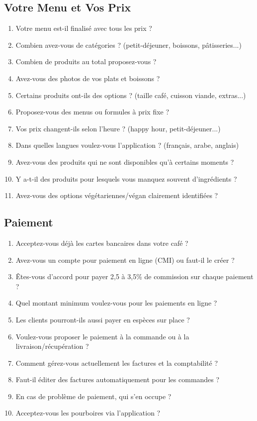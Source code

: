 \documentclass[11pt,a4paper]{article}
\begin{document}
\subsection{Votre Menu et Vos Prix}

\begin{enumerate}[resume]
    \item Votre menu est-il finalisé avec tous les prix ?
    \item Combien avez-vous de catégories ? (petit-déjeuner, boissons, pâtisseries...)
    \item Combien de produits au total proposez-vous ?
    \item Avez-vous des photos de vos plats et boissons ?
    \item Certains produits ont-ils des options ? (taille café, cuisson viande, extras...)
    \item Proposez-vous des menus ou formules à prix fixe ?
    \item Vos prix changent-ils selon l'heure ? (happy hour, petit-déjeuner...)
    \item Dans quelles langues voulez-vous l'application ? (français, arabe, anglais)
    \item Avez-vous des produits qui ne sont disponibles qu'à certains moments ?
    \item Y a-t-il des produits pour lesquels vous manquez souvent d'ingrédients ?
    \item Avez-vous des options végétariennes/végan clairement identifiées ?
\end{enumerate}

\subsection{Paiement}

\begin{enumerate}[resume]
    \item Acceptez-vous déjà les cartes bancaires dans votre café ?
    \item Avez-vous un compte pour paiement en ligne (CMI) ou faut-il le créer ?
    \item Êtes-vous d'accord pour payer 2,5 à 3,5\% de commission sur chaque paiement ?
    \item Quel montant minimum voulez-vous pour les paiements en ligne ?
    \item Les clients pourront-ils aussi payer en espèces sur place ?
    \item Voulez-vous proposer le paiement à la commande ou à la livraison/récupération ?
    \item Comment gérez-vous actuellement les factures et la comptabilité ?
    \item Faut-il éditer des factures automatiquement pour les commandes ?
    \item En cas de problème de paiement, qui s'en occupe ?
    \item Acceptez-vous les pourboires via l'application ?
\end{enumerate}
\end{document}

